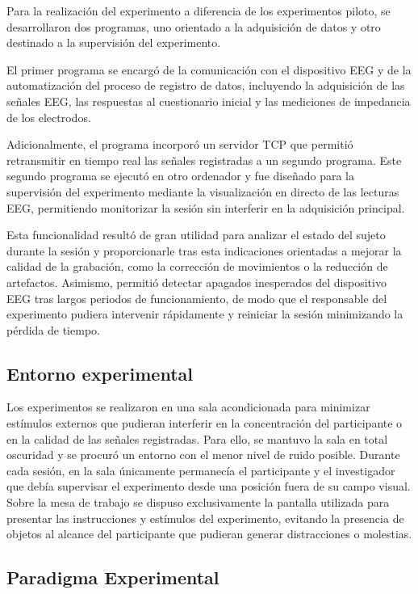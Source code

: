 Para la realización del experimento a diferencia de los experimentos piloto, se desarrollaron dos programas, uno orientado a la adquisición de datos y otro destinado a la supervisión del experimento.

El primer programa se encargó de la comunicación con el dispositivo EEG y de la automatización del proceso de registro de datos, incluyendo la adquisición de las señales EEG, las respuestas al cuestionario inicial y las mediciones de impedancia de los electrodos.

Adicionalmente, el programa incorporó un servidor TCP que permitió retransmitir en tiempo real las señales registradas a un segundo programa. Este segundo programa se ejecutó en otro ordenador y fue diseñado para la supervisión del experimento mediante la visualización en directo de las lecturas EEG, permitiendo monitorizar la sesión sin interferir en la adquisición principal.

Esta funcionalidad resultó de gran utilidad para analizar el estado del sujeto durante la sesión y proporcionarle tras esta indicaciones orientadas a mejorar la calidad de la grabación, como la corrección de movimientos o la reducción de artefactos. Asimismo, permitió detectar apagados inesperados del dispositivo EEG tras largos periodos de funcionamiento, de modo que el responsable del experimento pudiera intervenir rápidamente y reiniciar la sesión minimizando la pérdida de tiempo.

\subsection{Entorno experimental}
\label{subsec:Entorno}

Los experimentos se realizaron en una sala acondicionada para minimizar estímulos externos que pudieran interferir en la concentración del participante o en la calidad de las señales registradas. Para ello, se mantuvo la sala en total oscuridad y se procuró un entorno con el menor nivel de ruido posible. Durante cada sesión, en la sala únicamente permanecía el participante y el investigador que debía supervisar el experimento desde una posición fuera de su campo visual. Sobre la mesa de trabajo se dispuso exclusivamente la pantalla utilizada para presentar las instrucciones y estímulos del experimento, evitando la presencia de objetos al alcance del participante que pudieran generar distracciones o molestias.

\subsection{Paradigma Experimental}
\label{subsec:paradigma}

